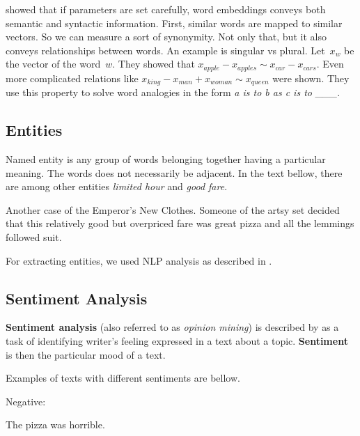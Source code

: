 \citet{Mik13} showed that if parameters are set carefully, word embeddings conveys both semantic and syntactic information.
First, similar words are mapped to similar vectors. So we can measure a sort of synonymity.
Not only that, but it also conveys relationships between words.
An example is singular vs plural.
Let~$x_{w}$ be the vector of the word~$w$.
They showed that $x_{apple}-x_{apples} \sim x_{car}-x_{cars}$.
Even more complicated relations like $x_{king} - x_{man} + x_{woman} \sim x_{queen}$ were shown.
They use this property to solve word analogies in the form {\it a is to b as c is to \_\_\_}.


\subsection{Entities}

Named entity is any group of words belonging together having a particular meaning.
The words does not necessarily be adjacent.
In the text bellow, there are among other entities \textit{limited hour} and \textit{good fare}.

\begin{code}
Another case of the Emperor's New Clothes.
Someone of the artsy set decided that this relatively good
but overpriced fare was great pizza and all the lemmings followed suit.
\end{code}

For extracting entities, we used NLP analysis as described in .



\subsection{Sentiment Analysis}

\textbf{Sentiment analysis} (also referred to as \textit{opinion mining}) is described by \citet{melville2009sentiment} 
as a task of identifying writer's feeling expressed in a text about a topic.
\textbf{Sentiment} is then the particular mood of a text.

Examples of texts with different sentiments are bellow.

Negative:

\begin{code}
The pizza was horrible.
\end{code}

